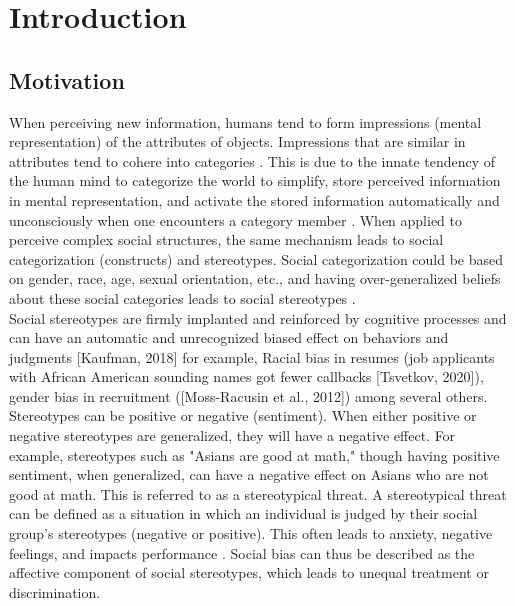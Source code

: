 \chapter{Introduction}
\section{Motivation}

When perceiving new information, humans tend to form impressions (mental representation) of the attributes of objects. Impressions that are similar in attributes tend to cohere into categories \cite{fiske1998stereotyping}\cite{allport1954nature}. This is due to the innate tendency of the human mind to categorize the world to simplify, store perceived information in mental representation, and activate the stored information automatically and unconsciously when one encounters
a category member \cite{ComputationalEthics}. When applied to perceive complex social structures, the same mechanism leads to social categorization (constructs) and stereotypes. Social categorization could be based on gender, race, age, sexual orientation, etc., and having over-generalized beliefs about these social categories leads to social stereotypes \cite{beukeboom2019stereotypes}\cite{ComputationalEthics}.	
\\

Social stereotypes are firmly implanted and reinforced by cognitive processes and can have
an automatic and unrecognized biased effect on behaviors and judgments [Kaufman, 2018]
for example, Racial bias in resumes (job applicants with African American sounding names
got fewer callbacks [Tsvetkov, 2020]), gender bias in recruitment ([Moss-Racusin et al., 2012])
among several others. Stereotypes can be positive or negative (sentiment). When either positive or negative stereotypes are generalized, they will have a negative effect. For example, stereotypes such as "Asians are good at math," though having positive sentiment, when generalized, can have a negative effect on Asians who are not good at math. This is referred to as a stereotypical threat. A stereotypical threat can be defined as a situation in which an individual is judged by their social group's stereotypes (negative or positive). This often leads to anxiety, negative feelings, and impacts performance \cite{beukeboom2019stereotypes}\cite{spencer2016stereotype}. Social
bias can thus be described as the affective component of social stereotypes, which leads to unequal treatment or
discrimination.
\\

